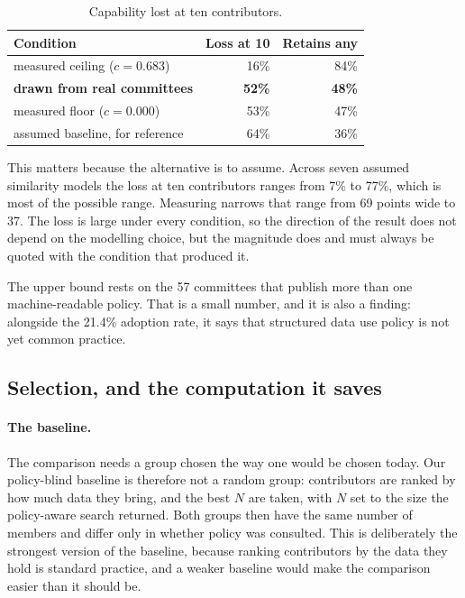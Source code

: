 \documentclass[sigconf,anonymous,review]{acmart}
\begin{document}
\begin{table}[h]
\caption{Capability lost at ten contributors.}
\label{tab:erosion}
\begin{tabular}{lrr}
\toprule
Condition & Loss at 10 & Retains any \\
\midrule
measured ceiling ($c=0.683$) & 16\% & 84\% \\
\textbf{drawn from real committees} & \textbf{52\%} & \textbf{48\%} \\
measured floor ($c=0.000$) & 53\% & 47\% \\
\midrule
assumed baseline, for reference & 64\% & 36\% \\
\bottomrule
\end{tabular}
\end{table}

This matters because the alternative is to assume. Across seven assumed similarity
models the loss at ten contributors ranges from 7\% to 77\%, which is most of the
possible range. Measuring narrows that range from 69 points wide to 37. The loss is
large under every condition, so the direction of the result does not depend on the
modelling choice, but the magnitude does and must always be quoted with the
condition that produced it.

The upper bound rests on the 57 committees that publish more than one
machine-readable policy. That is a small number, and it is also a finding:
alongside the 21.4\% adoption rate, it says that structured data use policy is not
yet common practice.

\subsection{Selection, and the computation it saves}
\label{sec:saving}

\paragraph{The baseline.} The comparison needs a group chosen the way one would be
chosen today. Our policy-blind baseline is therefore not a random group:
contributors are ranked by how much data they bring, and the best $N$ are taken,
with $N$ set to the size the policy-aware search returned. Both groups then have
the same number of members and differ only in whether policy was consulted. This
is deliberately the strongest version of the baseline, because ranking
contributors by the data they hold is standard practice, and a weaker baseline
would make the comparison easier than it should be.
\end{document}
